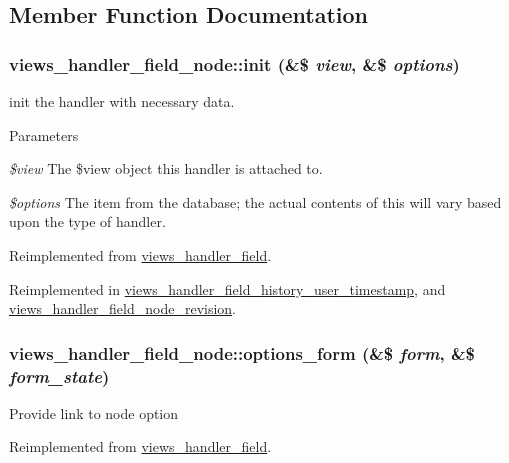 \subsection{Member Function Documentation}
\hypertarget{classviews__handler__field__node_a4f263bde5682e4c2285a0e51a7f8b472}{
\subsubsection[{init}]{\setlength{\rightskip}{0pt plus 5cm}views\_\-handler\_\-field\_\-node::init (\&\$ {\em view}, \/  \&\$ {\em options})}}
\label{classviews__handler__field__node_a4f263bde5682e4c2285a0e51a7f8b472}
init the handler with necessary data. 
\begin{DoxyParams}{Parameters}
\item[{\em \$view}]The \$view object this handler is attached to. \item[{\em \$options}]The item from the database; the actual contents of this will vary based upon the type of handler. \end{DoxyParams}


Reimplemented from \hyperlink{classviews__handler__field_a3a290c7df3ead81e5cd244ad5335b1cc}{views\_\-handler\_\-field}.

Reimplemented in \hyperlink{classviews__handler__field__history__user__timestamp_addc2c91173eae704e1283e726c6f15d0}{views\_\-handler\_\-field\_\-history\_\-user\_\-timestamp}, and \hyperlink{classviews__handler__field__node__revision_aa89b3130f87bc8811d777a29f8e4468c}{views\_\-handler\_\-field\_\-node\_\-revision}.\hypertarget{classviews__handler__field__node_af3d8a04be282a20079ea4fb82e768910}{
\subsubsection[{options\_\-form}]{\setlength{\rightskip}{0pt plus 5cm}views\_\-handler\_\-field\_\-node::options\_\-form (\&\$ {\em form}, \/  \&\$ {\em form\_\-state})}}
\label{classviews__handler__field__node_af3d8a04be282a20079ea4fb82e768910}
Provide link to node option 

Reimplemented from \hyperlink{classviews__handler__field_a0435d161922b7b4b84f02a2e79bb947a}{views\_\-handler\_\-field}.

